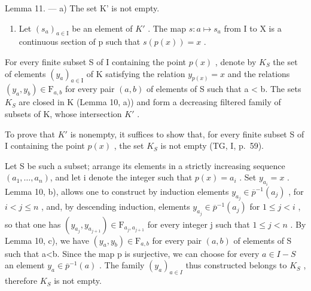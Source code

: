 Lemma 11. --- a) The set K' is not empty.

\begin{enumerate}
\def\labelenumi{\alph{enumi})}
\setcounter{enumi}{1}
\tightlist
\item
  Let \((s_{a})_{a\in\mathrm{I}}\) be an element of \(K'\) . The map \(s\colon a\mapsto s_{a}\) from I to X is a continuous section of p such that \(s(p(x))=x\) .
\end{enumerate}

For every finite subset S of I containing the point \(p(x)\) , denote by \(K_{S}\) the set of elements \((y_{a})_{a\in\mathrm{I}}\) of K satisfying the relation \(y_{p(x)} = x\) and the relations \((y_{a}, y_{b}) \in \mathrm{F}_{a,b}\) for every pair \((a, b)\) of elements of S such that a \textless{} b. The sets \(K_{S}\) are closed in K (Lemma 10, a)) and form a decreasing filtered family of subsets of K, whose intersection \(K'\) .

To prove that \(K'\) is nonempty, it suffices to show that, for every finite subset S of I containing the point \(p(x)\) , the set \(K_{S}\) is not empty (TG, I, p.~59).

Let S be such a subset; arrange its elements in a strictly increasing sequence \((a_{1},\ldots,a_{n})\), and let i denote the integer such that \(p(x)=a_{i}\) . Set \(y_{a_{i}}=x\) . Lemma 10, b), allows one to construct by induction elements \(y_{a_{j}}\in\overline{p}^{-1}(a_{j})\) , for \(i<j\leqslant n\) , and, by descending induction, elements \(y_{a_{j}}\in\overline{p}^{-1}(a_{j})\) for \(1\leqslant j<i\) , so that one has \((y_{a_{j}},y_{a_{j+1}})\in\mathrm{F}_{a_{j},a_{j+1}}\) for every integer j such that \(1\leqslant j<n\) . By Lemma 10, c), we have \((y_{a},y_{b})\in\mathrm{F}_{a,b}\) for every pair \((a,b)\) of elements of S such that a\textless b. Since the map p is surjective, we can choose for every \(a\in I-S\) an element \(y_{a}\in\overline{p}^{-1}(a)\) . The family \((y_{a})_{a\in I}\) thus constructed belongs to \(K_{S}\) , therefore \(K_{S}\) is not empty.

